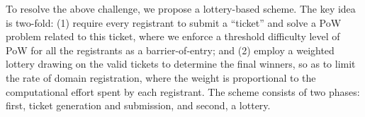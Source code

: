 \documentclass[USenglish,oneside,twocolumn]{article}
\begin{document}

To resolve the above challenge, we propose a lottery-based scheme. The key idea is two-fold: (1) require every registrant to submit a ``ticket'' and solve a PoW problem related to this ticket, where we enforce a threshold difficulty level of PoW for all the registrants as a barrier-of-entry; and (2) employ a weighted lottery drawing on the valid tickets to determine the final winners, so as to limit the rate of domain registration, where the weight is proportional to the computational effort spent by each registrant. The scheme consists of  two phases: first, ticket generation and submission, and second, a lottery.
 
\end{document}
